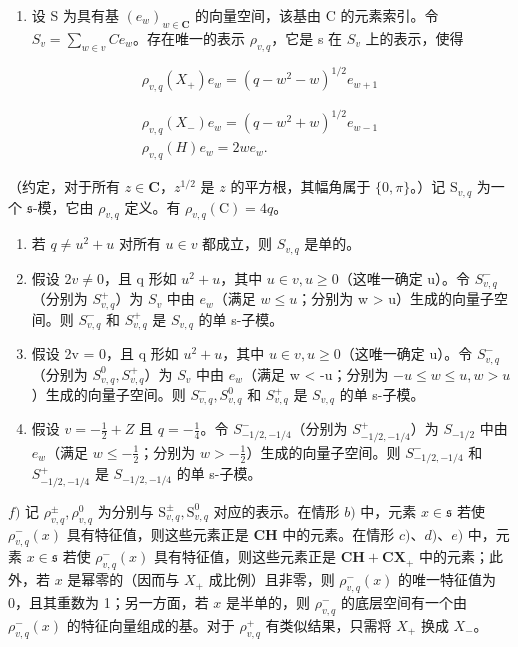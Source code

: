 \begin{enumerate}
\def\labelenumi{\alph{enumi})}
\tightlist
\item
  设 S 为具有基 \((e_{w})_{w\in\mathbf{C}}\) 的向量空间，该基由 C 的元素索引。令 \(S_{v}=\sum_{w\in v}Ce_{w}\)。存在唯一的表示 \(\rho_{v,q}\)，它是 s 在 \(S_{v}\) 上的表示，使得
\end{enumerate}

\[
\rho_ {v, q} (X _ {+}) e _ {w} = (q - w ^ {2} - w) ^ {1 / 2} e _ {w + 1}
\]

\[
\begin{array}{c} \rho_ {v, q} (X _ {-}) e _ {w} = (q - w ^ {2} + w) ^ {1 / 2} e _ {w - 1} \\ \rho_ {v, q} (H) e _ {w} = 2 w e _ {w}. \end{array}
\]

（约定，对于所有 \(z \in \mathbf{C}\)，\(z^{1/2}\) 是 \(z\) 的平方根，其幅角属于 \(\{0, \pi\}\)。）记 \(\mathrm{S}_{v,q}\) 为一个 \(\mathfrak{s}\)-模，它由 \(\rho_{v,q}\) 定义。有 \(\rho_{v,q}(\mathrm{C}) = 4q\)。

\begin{enumerate}
\def\labelenumi{\alph{enumi})}
\setcounter{enumi}{1}
\item
  若 \(q \neq u^2 + u\) 对所有 \(u \in v\) 都成立，则 \(S_{v,q}\) 是单的。
\item
  假设 \(2v \neq 0\)，且 q 形如 \(u^{2} + u\)，其中 \(u \in v, u \geq 0\)（这唯一确定 u）。令 \(S_{v,q}^{-}\)（分别为 \(S_{v,q}^{+}\)）为 \(S_{v}\) 中由 \(e_{w}\)（满足 \(w \leq u\)；分别为 w \textgreater{} u）生成的向量子空间。则 \(S_{v,q}^{-}\) 和 \(S_{v,q}^{+}\) 是 \(S_{v,q}\) 的单 s-子模。
\item
  假设 2v = 0，且 q 形如 \(u^{2} + u\)，其中 \(u \in v, u \geq 0\)（这唯一确定 u）。令 \(S_{v,q}^{-}\)（分别为 \(S_{v,q}^{0}, S_{v,q}^{+}\)）为 \(S_{v}\) 中由 \(e_{w}\)（满足 w \textless{} -u；分别为 \(-u \leq w \leq u, w > u\)）生成的向量子空间。则 \(S_{v,q}^{-}, S_{v,q}^{0}\) 和 \(S_{v,q}^{+}\) 是 \(S_{v,q}\) 的单 s-子模。
\item
  假设 \(v = -\frac{1}{2} + Z\) 且 \(q = -\frac{1}{4}\)。令 \(S_{-1/2,-1/4}^{-}\)（分别为 \(S_{-1/2,-1/4}^{+}\)）为 \(S_{-1/2}\) 中由 \(e_{w}\)（满足 \(w \leq -\frac{1}{2}\)；分别为 \(w > -\frac{1}{2}\)）生成的向量子空间。则 \(S_{-1/2,-1/4}^{-}\) 和 \(S_{-1/2,-1/4}^{+}\) 是 \(S_{-1/2,-1/4}\) 的单 s-子模。
\end{enumerate}

\(f)\) 记 \(\rho_{v,q}^{\pm},\rho_{v,q}^{0}\) 为分别与 \(\mathrm{S}_{v,q}^{\pm},\mathrm{S}_{v,q}^{0}\) 对应的表示。在情形 \(b)\) 中，元素 \(x\in \mathfrak{s}\) 若使 \(\rho_{v,q}^{-}(x)\) 具有特征值，则这些元素正是 \(\mathbf{CH}\) 中的元素。在情形 \(c)\)、\(d)\)、\(e)\) 中，元素 \(x\in \mathfrak{s}\) 若使 \(\rho_{v,q}^{-}(x)\) 具有特征值，则这些元素正是 \(\mathbf{CH} + \mathbf{CX}_+\) 中的元素；此外，若 \(x\) 是幂零的（因而与 \(X_{+}\) 成比例）且非零，则 \(\rho_{v,q}^{-}(x)\) 的唯一特征值为 0，且其重数为 1；另一方面，若 \(x\) 是半单的，则 \(\rho_{v,q}^{-}\) 的底层空间有一个由 \(\rho_{v,q}^{-}(x)\) 的特征向量组成的基。对于 \(\rho_{v,q}^{+}\) 有类似结果，只需将 \(X_{+}\) 换成 \(X_{-}\)。

